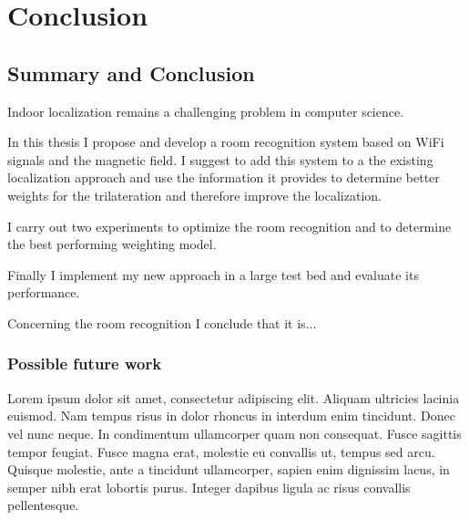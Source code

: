 \chapter{Conclusion}

\label{Chapter6}

\section{Summary and Conclusion}


Indoor localization remains a challenging problem in computer science.

In this thesis I propose and develop a room recognition system based on WiFi signals and the magnetic field. I suggest to add this system to a the existing localization approach and use the information it provides to determine better weights for the trilateration and therefore improve the localization.

I carry out two experiments to optimize the room recognition and to determine the best performing weighting model.

Finally I implement my new approach in a large test bed and evaluate its performance.

Concerning the room recognition I conclude that it is...
\subsection{Possible future work}

Lorem ipsum dolor sit amet, consectetur adipiscing elit. Aliquam ultricies lacinia euismod. Nam tempus risus in dolor rhoncus in interdum enim tincidunt. Donec vel nunc neque. In condimentum ullamcorper quam non consequat. Fusce sagittis tempor feugiat. Fusce magna erat, molestie eu convallis ut, tempus sed arcu. Quisque molestie, ante a tincidunt ullamcorper, sapien enim dignissim lacus, in semper nibh erat lobortis purus. Integer dapibus ligula ac risus convallis pellentesque.

